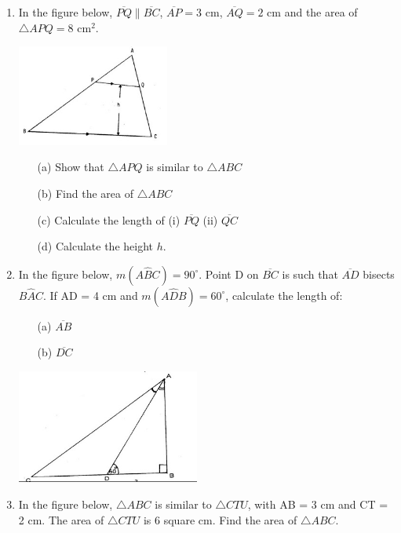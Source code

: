 \begin{enumerate}
	\item In the figure below, $\overline{PQ} \parallel \overline{BC}$, $\overline{AP} = 3$ cm, $\overline{AQ} = 2$ cm and the area of $\bigtriangleup APQ = 8$ cm$^2$.
	\begin{center}
	\includegraphics[width=5cm]{./img/sim8.jpg}
	\end{center}

	\begin{itemize}
	\item[(a)] Show that $\bigtriangleup APQ$ is similar to $\bigtriangleup ABC$
	\item[(b)] Find the area of $\bigtriangleup ABC$
	\item[(c)] Calculate the length of (i) $\overline{PQ}$  \quad (ii) $\overline{QC}$ 
	\item[(d)] Calculate the height $h$.
	\end{itemize}
	
	\item In the figure below, $m(A\hat{B}C) = 90^\circ$. Point D on $\overline{BC}$ is such that $\overline{AD}$ bisects $B\hat{A}C$. If AD = 4 cm and $m(A\hat{D}B) = 60^\circ$, calculate the length of:
		\begin{itemize}
		\item[(a)] $\overline{AB}$
		\item[(b)] $\overline{DC}$
		\end{itemize}
		
	\begin{center}
	\includegraphics[width=6cm]{./img/sim9.jpg}
	\end{center}
	
	\item In the figure below, $\bigtriangleup ABC$ is similar to $\bigtriangleup CTU$, with AB = 3 cm and CT = 2 cm. The area of $\bigtriangleup CTU$ is 6 square cm. Find the area of $\bigtriangleup ABC$.
	

\end{enumerate}
